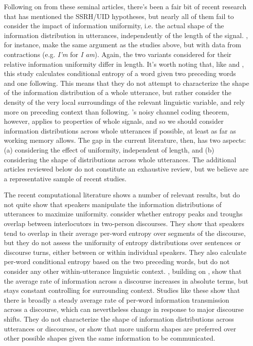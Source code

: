 \documentclass[12pt]{article}
\begin{document}
Following on from these seminal articles, there's been a fair bit of recent research that has mentioned the SSRH/UID hypotheses, but nearly all of them fail to consider the impact of information uniformity, i.e. the actual shape of the information distribution in utterances, independently of the length of the signal. \citet{frankjaeger2008}, for instance, make the same argument as the studies above, but with data from contractions (e.g. \textsl{I'm} for \textsl{I am}). Again, the two variants considered for their relative information uniformity differ in length. It's worth noting that, like \citet{levyjaeger2007} and \citet{jaeger2010}, this study calculates conditional entropy of a word given two preceding words and one following. This means that they do not attempt to characterize the shape of the information distribution of a whole utterance, but rather consider the density of the very local surroundings of the relevant linguistic variable, and rely more on preceding context than following. \citet{shannon1948}'s noisy channel coding theorem, however, applies to properties of whole signals, and so we should consider information distributions across whole utterances if possible, at least as far as working memory allows. The gap in the current literature, then, has two aspects: (a) considering the effect of uniformity, independent of length, and (b) considering the shape of distributions across whole utterances. The additional articles reviewed below do not constitute an exhaustive review, but we believe are a representative sample of recent studies.

The recent computational literature shows a number of relevant results, but do not quite show that speakers manipulate the information distributions of utterances to maximize uniformity. \citet{xureitter2016, xureitter2018} consider whether entropy peaks and troughs overlap between interlocutors in two-person discourses. They show that speakers tend to overlap in their average per-word entropy over segments of the discourse, but they do not assess the uniformity of entropy distributions over sentences or discourse turns, either between or within individual speakers. They also calculate per-word conditional entropy based on the two preceding words, but do not consider any other within-utterance linguistic context. \citet{doylefrank2015}, building on \citet{genzelcharniak2002}, show that the average rate of information across a discourse increases in absolute terms, but stays constant controlling for surrounding context. Studies like these show that there is broadly a steady average rate of per-word information transmission across a discourse, which can nevertheless change in response to major discourse shifts. They do not characterize the shape of information distributions across utterances or discourses, or show that more uniform shapes are preferred over other possible shapes given the same information to be communicated.
\end{document}
